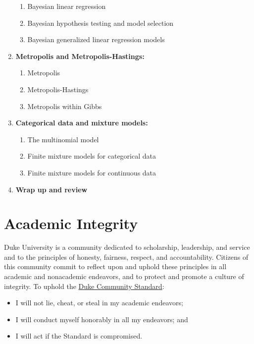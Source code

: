 \documentclass[11pt, a4paper]{article}
\begin{document}
\begin{enumerate}[label= {\color{darkblue}{\ArrowBoldRightStrobe}}]
	\begin{enumerate}[label= {\color{cyan}{\Rectangle}}]
		\item Bayesian linear regression
		\item Bayesian hypothesis testing and model selection
		\item Bayesian generalized linear regression models
	\end{enumerate}
	\item \textbf{Metropolis and Metropolis-Hastings: }
	\begin{enumerate}[label= {\color{cyan}{\Rectangle}}]
		\item Metropolis
		\item Metropolis-Hastings
		\item Metropolis within Gibbs
	\end{enumerate}
	\item \textbf{Categorical data and mixture models: }
	\begin{enumerate}[label= {\color{cyan}{\Rectangle}}]
		\item The multinomial model
		\item Finite mixture models for categorical data
		\item Finite mixture models for continuous data
	\end{enumerate}
	\item \textbf{Wrap up and review}
\end{enumerate}


\section{Academic Integrity}  
Duke University is a community dedicated to scholarship, leadership, and service and to the principles of honesty, fairness, respect, and accountability. Citizens of this community commit to reflect upon and uphold these principles in all academic and nonacademic endeavors, and to protect and promote a culture of integrity. To uphold the \href{https://studentaffairs.duke.edu/conduct/about-us/duke-community-standard}{Duke Community Standard}:
\begin{itemize}[label= {\color{darkred}{\Large \HandRight}}]
	\item I will not lie, cheat, or steal in my academic endeavors;
	\item I will conduct myself honorably in all my endeavors; and
	\item I will act if the Standard is compromised.
\end{itemize}
\end{document}
